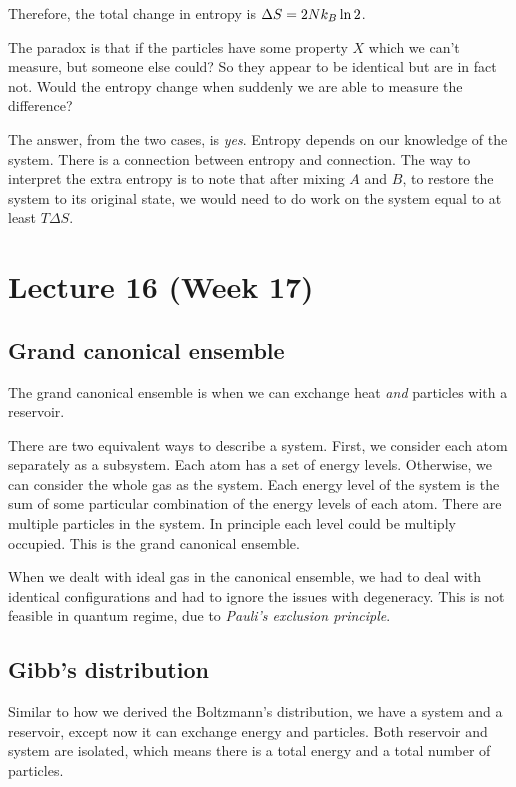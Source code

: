 \documentclass[12pt,chapterprefix=false,dvipsnames]{scrbook}
\theoremstyle{dotless}
\theoremstyle{definition}
\begin{document}
Therefore, the total change in entropy is
$\Delta S = 2 N k_B \naturallogarithm{2}$.

The paradox is that if the particles have some property
$X$ which we can't measure, but someone else
could? So they appear to be identical but are in fact not. Would
the entropy change when suddenly we are able to measure the
difference?

The answer, from the two cases, is \textit{yes}.
Entropy depends on our knowledge of the system. There is a
connection between entropy and connection. The way to interpret
the extra entropy is to note that after mixing
$A$ and $B$, to restore
the system to its original state, we would need to do work on
the system equal to at least $T\Delta S$.

\chapter{Lecture 16 (Week 17)}%
\label{cha:lecture_16}

\section{Grand canonical ensemble}%
\label{sec:grand_canonical_ensemble}

The grand canonical ensemble is when we can exchange heat
\textit{and} particles with a reservoir.

There are two equivalent ways to describe a system. First, we
consider each atom separately as a subsystem. Each atom has a
set of energy levels. Otherwise, we can consider the whole gas
as the system. Each energy level of the system is the sum of
some particular combination of the energy levels of each atom.
There are multiple particles in the system. In principle each
level could be multiply occupied. This is the grand canonical
ensemble.

When we dealt with ideal gas in the canonical ensemble, we had
to deal with identical configurations and had to ignore the
issues with degeneracy. This is not feasible in quantum regime,
due to \textit{Pauli's exclusion principle}.

\section{Gibb's distribution}%
\label{sec:gibb_s_distribution}

Similar to how we derived the Boltzmann's distribution, we have
a system and a reservoir, except now it can exchange energy and
particles. Both reservoir and system are isolated, which means
there is a total energy and a total number of particles.
\end{document}
